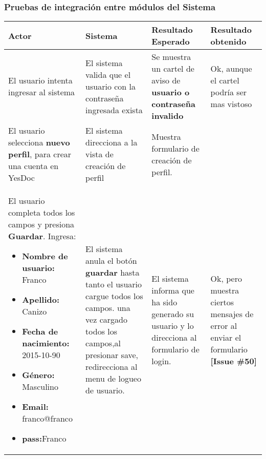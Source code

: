 
\subsubsection{Pruebas  de  integración  entre módulos del Sistema}


\begin{longtable}{|m{3.5cm}|m{3.5cm}|m{3.5cm}|m{2.5cm}|}
\hline
\textbf{Actor}  & \textbf{Sistema}& \textbf{Resultado Esperado} & \textbf{Resultado obtenido} \\ \hline
\endhead

El usuario intenta ingresar al sistema & El sistema valida que el usuario con la contraseña ingresada exista 
& Se muestra un cartel de aviso de \textbf{usuario o contraseña invalido} 
& Ok, aunque el cartel podría ser mas vistoso 
\\ \hline



El usuario selecciona \textbf{nuevo perfil}, para
crear una cuenta en YesDoc 
& El sistema direcciona a la vista de creación de perfil
& Muestra formulario de creación de perfil.
&
\\ \hline



 El usuario completa todos los campos y presiona \textbf{Guardar}.
 Ingresa:
\begin{itemize}
	\item \textbf{Nombre de usuario:} Franco
	\item \textbf{Apellido:} Canizo
	\item \textbf{Fecha de nacimiento: }2015-10-90
	\item \textbf{Género: }Masculino
	\item \textbf{Email: }franco@franco
	\item \textbf{pass:}Franco

\end{itemize}
& El sistema anula el botón \textbf{guardar} hasta tanto el usuario cargue todos los campos. una vez cargado todos los campos,al presionar save, redirecciona al menu
de logueo de usuario.
& El sistema informa que ha sido generado su usuario y lo direcciona al formulario de login.
& Ok, pero muestra ciertos mensajes de error al enviar el formulario \textbf{[Issue \#50]}
\\ \hline




\end{longtable}
